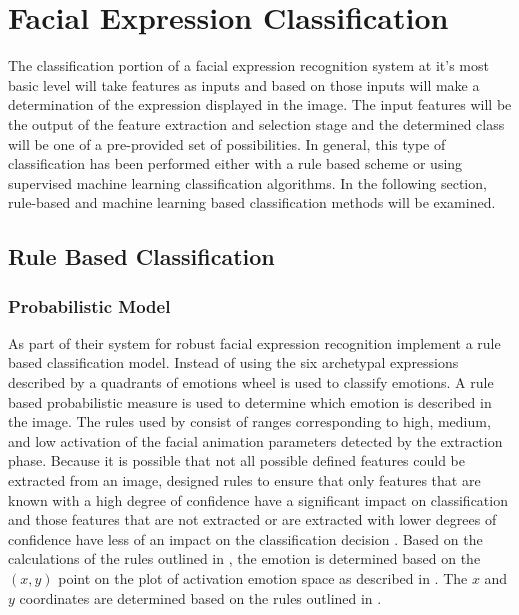 \documentclass{IEEEtran}
\begin{document}
\fi
\section{Facial Expression Classification} \label{classification}
The classification portion of a facial expression recognition system at it's most basic level will take features as inputs and based on those inputs will make a determination of the expression displayed in the image. The input features will be the output of the feature extraction and selection stage and the determined class will be one of a pre-provided set of possibilities. In general, this type of classification has been performed either with a rule based scheme or using supervised machine learning classification algorithms. In the following section, rule-based and machine learning based classification methods will be examined.


\subsection{Rule Based Classification} \label{3-RBC}
\subsubsection{Probabilistic Model} As part of their system for robust facial expression recognition \cite{ioannou2007robust} implement a rule based classification model.
Instead of using the six archetypal expressions described by \cite{ekman1987universals} a quadrants of emotions wheel is used to classify emotions. A rule based probabilistic measure is used to determine which emotion is described in the image. The rules used by \cite{ioannou2007robust} consist of ranges corresponding to high, medium, and low activation of the facial animation parameters detected by the extraction phase. Because it is possible that not all possible defined features could be extracted from an image, \cite{ioannou2007robust} designed rules to ensure that only features that are known with a high degree of confidence have a significant impact on classification and those features that are not extracted or are extracted with lower degrees of confidence have less of an impact on the classification decision \cite{ioannou2007robust}. Based on the calculations of the rules outlined in \cite{ioannou2007robust}, the emotion is determined based on the $(x,y)$ point on the plot of activation emotion space as described in \cite{ioannou2007robust}. The $x$ and $y$ coordinates are determined based on the rules outlined in \cite{ioannou2007robust}.
\end{document}
